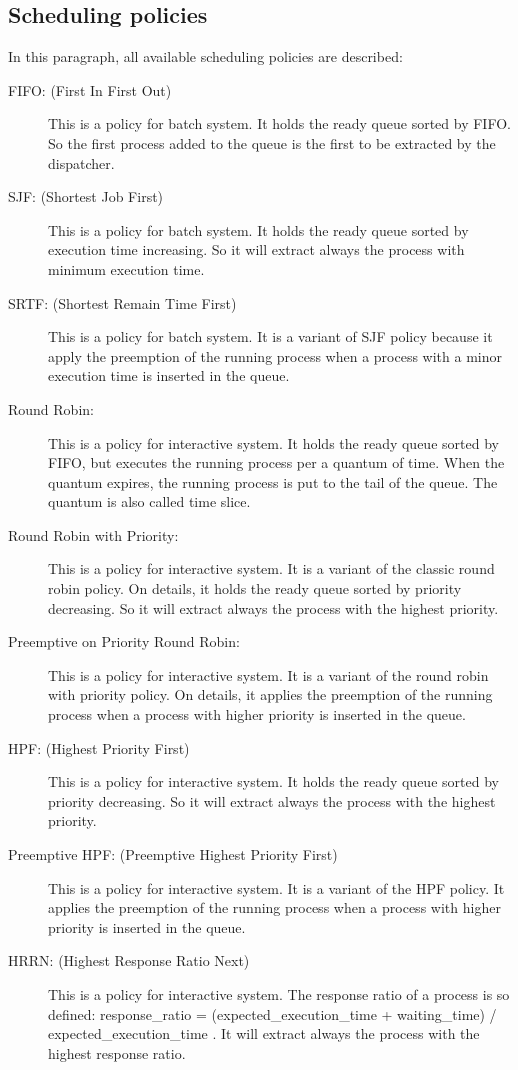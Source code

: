 \documentclass[10pt,a4paper,twoside,titlepage]{article}
\begin{document}
\subsection{Scheduling policies}
\label{subsec:Scheduling policies}
In this paragraph, all available scheduling policies are described: 
\begin{description}
 \item [FIFO: (First In First Out)] This is a policy for batch system. It holds the ready queue sorted by FIFO. So the first process added to the queue is the first to be extracted by the dispatcher. 
 \item [SJF: (Shortest Job First)] This is a policy for batch system. It holds the ready queue sorted by execution time increasing. So it will extract always the process with minimum execution time. 
 \item [SRTF: (Shortest Remain Time First)] This is a policy for batch system. It is a variant of SJF policy because it apply the preemption of the running process when a process with a minor execution time is inserted in the queue. 
 \item [Round Robin:] This is a policy for interactive system. It holds the ready queue sorted by FIFO, but executes the running process per a quantum of time. When the quantum expires, the running process is put to the tail of the queue. The quantum is also called time slice. 
 \item [Round Robin with Priority:] This is a policy for interactive system. It is a variant of the classic round robin policy. On details, it holds the ready queue sorted by priority decreasing. So it will extract always the process with the highest priority. 
 \item [Preemptive on Priority Round Robin:] This is a policy for interactive system. It is a variant of the round robin with priority policy. On details, it applies the preemption of the running process when a process with higher priority is inserted in the queue. 
 \item [HPF: (Highest Priority First)] This is a policy for interactive system. It holds the ready queue sorted by priority decreasing. So it will extract always the process with the highest priority. 
 \item [Preemptive HPF: (Preemptive Highest Priority First)] This is a policy for interactive system. It is a variant of the HPF policy. It applies the preemption of the running process when a process with higher priority is inserted in the queue. 
 \item [HRRN: (Highest Response Ratio Next)] This is a policy for interactive system. The response ratio of a process is so defined: response\_ratio = (expected\_execution\_time + waiting\_time) / expected\_execution\_time . It will extract always the process with the highest response ratio. 

\end{description}
\end{document}
